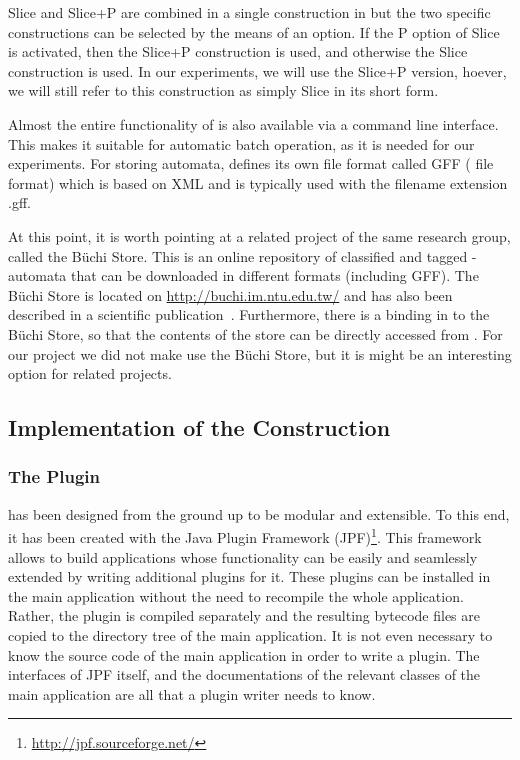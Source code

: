 Slice and Slice+P are combined in a single construction in \goal{} but the two specific constructions can be selected by the means of an option. If the P option of Slice is activated, then the Slice+P construction is used, and otherwise the Slice construction is used. In our experiments, we will use the Slice+P version, hoever, we will still refer to this construction as simply Slice in its short form.

Almost the entire functionality of \goal{} is also available via a command line interface. This makes it suitable for automatic batch operation, as it is needed for our experiments. For storing automata, \goal{} defines its own file format called GFF (\goal{} file format) which is based on XML and is typically used with the filename extension \textsf{.gff}.

At this point, it is worth pointing at a related project of the same research group, called the Büchi Store. This is an online repository of classified and tagged \om-automata that can be downloaded in different formats (including GFF). The Büchi Store is located on \url{http://buchi.im.ntu.edu.tw/} and has also been described in a scientific publication~\cite{2011_buchi_store}. Furthermore, there is a binding in \goal{} to the Büchi Store, so that the contents of the store can be directly accessed from \goal{}. For our project we did not make use the Büchi Store, but it is might be an interesting option for related projects.


\subsection{Implementation of the Construction}
\label{4_implementation}
\subsubsection{The \goal{} Plugin}
\goal{} has been designed from the ground up to be modular and extensible. To this end, it has been created with the Java Plugin Framework (JPF)\footnote{\url{http://jpf.sourceforge.net/}}. This framework allows to build applications whose functionality can be easily and seamlessly extended by writing additional plugins for it. These plugins can be installed in the main application without the need to recompile the whole application. Rather, the plugin is compiled separately and the resulting bytecode files are copied to the directory tree of the main application. It is not even necessary to know the source code of the main application in order to write a plugin. The interfaces of JPF itself, and the documentations of the relevant classes of the main application are all that a plugin writer needs to know.

